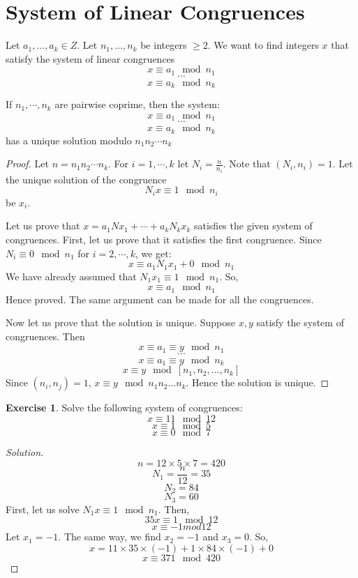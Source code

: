 \documentclass[12pt,letterpaper]{amsbook}
\theoremstyle{definition}
\newtheorem*{exercise}{Exercise}
\newenvironment{solution}
  {\renewcommand\qedsymbol{$\blacksquare$}\begin{proof}[Solution]}
  {\end{proof}}
\begin{document}
\section{System of Linear Congruences}

Let $a_1,...,a_k \in Z$. Let $n_1,...,n_k$ be integers $\geq 2$. We want to find integers $x$ that satisfy the system of linear congruences
\[x \equiv a_1 \mod n_1\]
\[ \cdots \]
\[x \equiv a_k \mod n_k\]

\begin{theorem}
  If $n_1,\cdots, n_k$ are pairwise coprime, then the system:
  \[x \equiv a_1 \mod n_1\]
  \[ \cdots \]
  \[x \equiv a_k \mod n_k\]
  has a unique solution modulo $n_1n_2 \cdots n_k$
\end{theorem}
\begin{proof}
  Let $n = n_1n_2\cdots n_k$. For $i = 1,\cdots,k$ let $N_i = \frac{n}{n_i}$. Note that $(N_i,n_i) = 1$. Let the unique solution of the congruence
  \[N_i x \equiv 1 \mod n_i\]
  be $x_i$.

  Let us prove that $x = a_1Nx_1 + \cdots + a_kN_k x_k$ satisfies the given system of congruences. First, let us prove that it satisfies the first congruence. Since $N_i \equiv 0 \mod n_1$ for $i = 2, \cdots, k$, we get:
  \[x \equiv a_1 N_1 x_1 + 0 \mod n_1\]
  We have already assumed that $N_1x_1 \equiv 1 \mod n_1$. So, 
  \[x \equiv a_1 \mod n_1\]
  Hence proved. The same argument can be made for all the congruences.

  Now let us prove that the solution is unique. Suppose $x,y$ satisfy the system of congruences. Then
  \[x \equiv a_1 \equiv y \mod n_1\]
  \[\cdots\]
  \[x \equiv a_1 \equiv y \mod n_k\]
  \[x \equiv y \mod [n_1,n_2,...,n_k]\]
  Since $(n_i,n_j) = 1$, $x \equiv y \mod n_1n_2...n_k$. Hence the solution is unique.
\end{proof}

\begin{exercise}
  Solve the following system of congruences:
  \[x \equiv 11 \mod 12\]
  \[x \equiv 1 \mod 5\]
  \[x \equiv 0 \mod 7\]
\end{exercise}
\begin{solution}
  \[n = 12 \times 5 \times 7 = 420 \]
  \[N_1 = \frac{n}{12} = 35\]
  \[N_2 = 84\]
  \[N_3 = 60\]
  First, let us solve $N_1 x \equiv 1 \mod n_1$. Then,
  \[35x \equiv 1 \mod 12\]
  \[x \equiv -1 mod 12\]
  Let $x_1 = -1$. The same way, we find $x_2 = -1$ and $x_3 = 0$. So,
  \[x = 11 \times 35 \times (-1) + 1 \times 84 \times (-1) + 0\]
  \[x \equiv 371 \mod 420\]
\end{solution}
\end{document}
